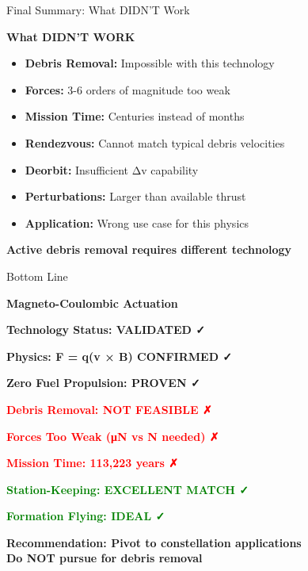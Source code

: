 \documentclass[aspectratio=169]{beamer}
\begin{document}
\begin{frame}{Final Summary: What DIDN'T Work}
\begin{center}
\Large\textbf{What DIDN'T WORK}

\vspace{1em}
\end{center}

\begin{itemize}
    \item[\textcolor{red}{\ding{55}}] \textbf{Debris Removal:} Impossible with this technology
    \item[\textcolor{red}{\ding{55}}] \textbf{Forces:} 3-6 orders of magnitude too weak
    \item[\textcolor{red}{\ding{55}}] \textbf{Mission Time:} Centuries instead of months
    \item[\textcolor{red}{\ding{55}}] \textbf{Rendezvous:} Cannot match typical debris velocities
    \item[\textcolor{red}{\ding{55}}] \textbf{Deorbit:} Insufficient Δv capability
    \item[\textcolor{red}{\ding{55}}] \textbf{Perturbations:} Larger than available thrust
    \item[\textcolor{red}{\ding{55}}] \textbf{Application:} Wrong use case for this physics
\end{itemize}

\vspace{1em}
\begin{center}
\textbf{Active debris removal requires different technology}
\end{center}
\end{frame}

\begin{frame}{Bottom Line}
\begin{center}
\LARGE\textbf{Magneto-Coulombic Actuation}

\vspace{1.5em}

\Large\textbf{Technology Status: VALIDATED ✓}

\textbf{Physics: F = q(v × B) CONFIRMED ✓}

\textbf{Zero Fuel Propulsion: PROVEN ✓}

\vspace{1.5em}

\textcolor{red}{\textbf{Debris Removal: NOT FEASIBLE ✗}}

\textcolor{red}{\textbf{Forces Too Weak (μN vs N needed) ✗}}

\textcolor{red}{\textbf{Mission Time: 113,223 years ✗}}

\vspace{1.5em}

\textcolor{green}{\textbf{Station-Keeping: EXCELLENT MATCH ✓}}

\textcolor{green}{\textbf{Formation Flying: IDEAL ✓}}

\vspace{1.5em}

\normalsize
\textbf{Recommendation: Pivot to constellation applications}\\
\textbf{Do NOT pursue for debris removal}
\end{center}
\end{frame}
\end{document}

